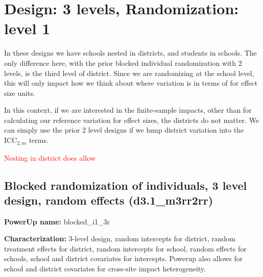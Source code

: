 \documentclass[12pt]{article}
\begin{document}

\newpage 
\section{Design: 3 levels, Randomization: level 1}

In these designs we have schools nested in districts, and students in schools.
The only difference here, with the prior blocked individual randomization with 2 levels, is the third level of district.
Since we are randomizing at the school level, this will only impact how we think about where variation is in terms of for effect size units.

In this context, if we are interested in the finite-sample impacts, other than for calculating our reference variation for effect sizes, the districts do not matter.
We can simply use the prior 2 level designs if we lump district variation into the $\text{ICC}_{2,m}$ terms.

\textcolor{red}{Nesting in district does allow}



\subsection{Blocked randomization of individuals, 3 level design, random effects (d3.1\_m3rr2rr)}

\textbf{PowerUp name:} blocked\_i1\_3r

\textbf{Characterization:} 3-level design, random intercepts for district, random treatment effects for district, random intercepts for school, random effects for schools, school and district covariates for intercepts. Powerup also allows for school and district covariates for cross-site impact heterogeneity.
\end{document}
